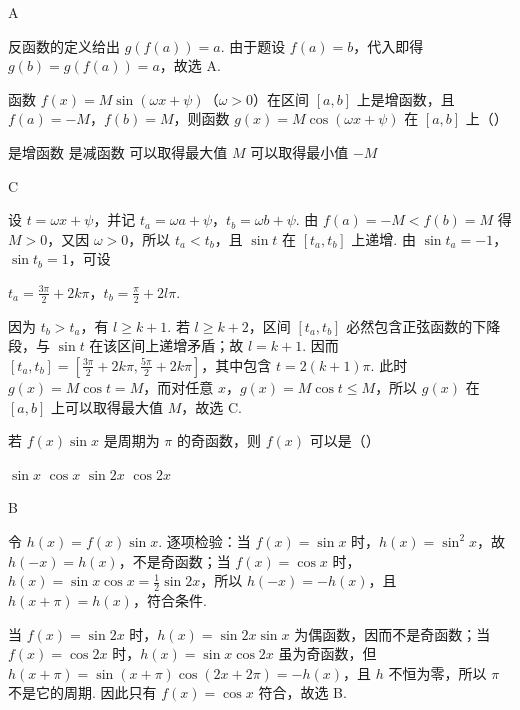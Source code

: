 \documentclass[UTF8,a4paper,oneside,11pt]{ctexbook}
\begin{document}
\begin{answer}
A
\end{answer}

\begin{solution}
反函数的定义给出 \(g(f(a))=a\). 由于题设 \(f(a)=b\)，代入即得
\(g(b)=g(f(a))=a\)，故选 A.
\end{solution}

\begin{problem}
函数 \(f(x)=M\sin(\omega x+\psi)\)（\(\omega>0\)）在区间 \([a,b]\) 上是增函数，且 \(f(a)=-M\)，\(f(b)=M\)，则函数 \(g(x)=M\cos(\omega x+\psi)\) 在 \([a,b]\) 上（\quad）

\choices
    {是增函数}
    {是减函数}
    {可以取得最大值 \(M\)}
    {可以取得最小值 \(-M\)}
\end{problem}

\begin{answer}
C
\end{answer}

\begin{solution}
设 \(t=\omega x+\psi\)，并记 \(t_a=\omega a+\psi\)，\(t_b=\omega b+\psi\). 由 \(f(a)=-M<f(b)=M\) 得 \(M>0\)，又因 \(\omega>0\)，所以 \(t_a<t_b\)，且 \(\sin t\) 在 \([t_a,t_b]\) 上递增. 由 \(\sin t_a=-1\)，\(\sin t_b=1\)，可设

\(t_a=\frac{3\pi}{2}+2k\pi\)，\(t_b=\frac{\pi}{2}+2l\pi\).

因为 \(t_b>t_a\)，有 \(l\ge k+1\). 若 \(l\ge k+2\)，区间 \([t_a,t_b]\) 必然包含正弦函数的下降段，与 \(\sin t\) 在该区间上递增矛盾；故 \(l=k+1\). 因而 \([t_a,t_b]=[\frac{3\pi}{2}+2k\pi,\frac{5\pi}{2}+2k\pi]\)，其中包含 \(t=2(k+1)\pi\). 此时
\(g(x)=M\cos t=M\)，而对任意 \(x\)，\(g(x)=M\cos t\le M\)，所以 \(g(x)\) 在 \([a,b]\) 上可以取得最大值 \(M\)，故选 C.
\end{solution}

\begin{problem}
若 \(f(x)\sin x\) 是周期为 \(\pi\) 的奇函数，则 \(f(x)\) 可以是（\quad）

\choices
    {\(\sin x\)}
    {\(\cos x\)}
    {\(\sin 2x\)}
    {\(\cos 2x\)}
\end{problem}

\begin{answer}
B
\end{answer}

\begin{solution}
令 \(h(x)=f(x)\sin x\). 逐项检验：当 \(f(x)=\sin x\) 时，\(h(x)=\sin^2x\)，故 \(h(-x)=h(x)\)，不是奇函数；当 \(f(x)=\cos x\) 时，
\(h(x)=\sin x\cos x=\frac12\sin 2x\)，所以 \(h(-x)=-h(x)\)，且 \(h(x+\pi)=h(x)\)，符合条件.

当 \(f(x)=\sin 2x\) 时，\(h(x)=\sin 2x\sin x\) 为偶函数，因而不是奇函数；当 \(f(x)=\cos 2x\) 时，\(h(x)=\sin x\cos 2x\) 虽为奇函数，但
\(h(x+\pi)=\sin(x+\pi)\cos(2x+2\pi)=-h(x)\)，且 \(h\) 不恒为零，所以 \(\pi\) 不是它的周期. 因此只有 \(f(x)=\cos x\) 符合，故选 B.
\end{solution}
\end{document}
